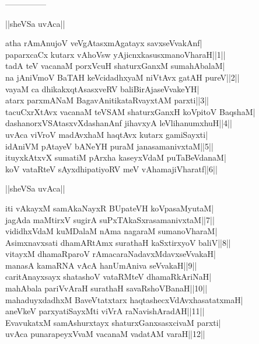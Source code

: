 \documentclass{article}
\begin{document}
\begin{center}
---------------
\end{center}

\begin{center}
||sheVSa uvAca||
\end{center}

atha rAmAnujoV veVgAtasxmAgatayx savxseVvakAnf|\\
paparxcaCx kutarx vAhoVsw yAjicnxkasusxmanoVharaH||1||\\
tadA teV vacanaM porxVcuH shaturxGanxM sumahAbalaM|\\
na jAniVmoV BaTAH keVcidadhxyaM niVtAvx gatAH pureV||2||\\
vayaM ca dhikakxqtAsasxveRV baliBirAjaseVvakeYH|\\
atarx parxmANaM BagavAnitikataRvayxtAM parxti||3||\\
tacuCxrXtAvx vacanaM teVSAM shaturxGanxH koVpitoV BaqshaM|\\
dashanorxVSAtasxvXdashanAnf jihavxyA leVlihanumxhuH||4||\\
uvAca viVroV madAvxhaM haqtAvx kutarx gamiSayxti|\\
idAniVM pAtayeV bANeYH puraM janasamanivxtaM||5||\\
ituyxkAtxvX sumatiM pArxha kaseyxVdaM puTaBeVdanaM|\\
koV vataRteV sAyxdhipatiyoRV meV vAhamajiVharatf||6||\\

\begin{center}
||sheVSa uvAca||
\end{center}

iti vAkayxM samAkaNayxR BUpateVH koVpasaMyutaM|\\
jagAda maMtirxV sugirA suPxTAkaSxrasamanivxtaM||7||\\
vididhxVdaM kuMDalaM nAma nagaraM sumanoVharaM|\\
Asimxnavxsati dhamARtAmx surathaH kaSxtirxyoV baliV||8||\\
vitayxM dhamaRparoV rAmacaraNadavxMdavxseVvakaH|\\
manasA kamaRNA vAcA hanUmAniva seVvakaH||9||\\
caritAnayxsayx shatashoV vataRMteV dhamaRkAriNaH|\\
mahAbala pariVvAraH surathaH savaRshoVBanaH||10||\\
mahaduyxdadhxM BaveVtatxtarx haqtashecxVdAvxhasatatxmaH|\\
aneVkeV parxyatiSayxMti viVrA raNavishAradAH||11||\\
EvavukatxM samAshurxtayx shaturxGanxsasxcivaM parxti|\\
uvAca punarapeyxVvaM vacanaM vadatAM varaH||12||\\
\end{document}
